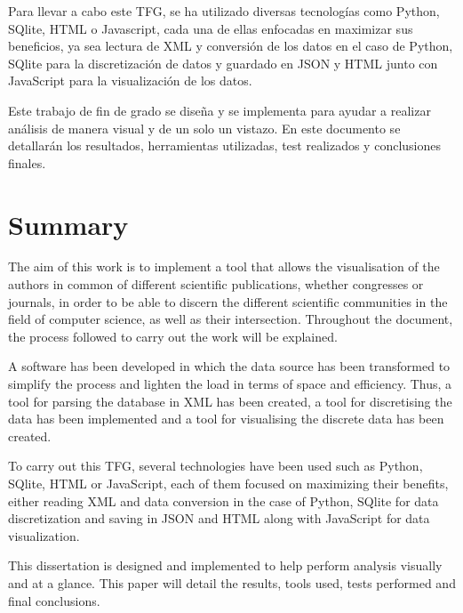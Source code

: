 \documentclass[a4paper, 12pt]{book}
\begin{document}
Para llevar a cabo este TFG, se ha utilizado diversas tecnologías como Python, SQlite, HTML o Javascript, cada una de ellas enfocadas en maximizar sus beneficios, ya sea lectura de XML y conversión de los datos en el caso de Python, SQlite para la discretización de datos y guardado en JSON y HTML junto con JavaScript para la visualización de los datos.

Este trabajo de fin de grado se diseña y se implementa para ayudar a realizar análisis de manera visual y de un solo un vistazo. En este documento se detallarán los resultados, herramientas utilizadas, test realizados y conclusiones finales.





\chapter*{Summary}

The aim of this work is to implement a tool that allows the visualisation of the authors in common of different scientific publications, whether congresses or journals, in order to be able to discern the different scientific communities in the field of computer science, as well as their intersection. Throughout the document, the process followed to carry out the work will be explained.

A software has been developed in which the data source has been transformed to simplify the process and lighten the load in terms of space and efficiency. Thus, a tool for parsing the database in XML has been created, a tool for discretising the data has been implemented and a tool for visualising the discrete data has been created.

To carry out this TFG, several technologies have been used such as Python, SQlite, HTML or JavaScript, each of them focused on maximizing their benefits, either reading XML and data conversion in the case of Python, SQlite for data discretization and saving in JSON and HTML along with JavaScript for data visualization.

This dissertation is designed and implemented to help perform analysis visually and at a glance. This paper will detail the results, tools used, tests performed and final conclusions.
\end{document}
